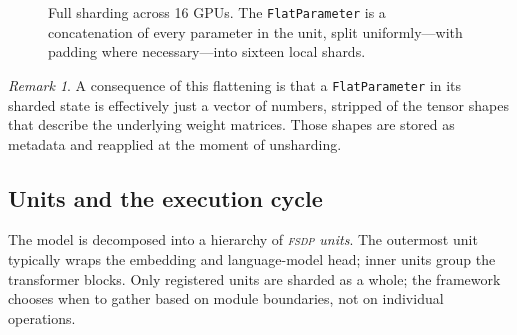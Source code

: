 \documentclass[11pt,a4paper]{article}
\theoremstyle{definition}
\theoremstyle{remark}
\newtheorem*{remark}{Remark}
\newcommand{\FSDP}{\textsc{fsdp}}
\begin{document}
\begin{figure}[ht]
\centering
{}
\caption{Full sharding across 16 GPUs. The \texttt{FlatParameter} is a concatenation of every parameter in the unit, split uniformly---with padding where necessary---into sixteen local shards.}
\label{fig:flatparam}
\end{figure}

\begin{remark}
A consequence of this flattening is that a \texttt{FlatParameter} in its sharded state is effectively just a vector of numbers, stripped of the tensor shapes that describe the underlying weight matrices. Those shapes are stored as metadata and reapplied at the moment of unsharding.
\end{remark}

\subsection{Units and the execution cycle}

The model is decomposed into a hierarchy of \emph{\FSDP{} units}. The outermost unit typically wraps the embedding and language-model head; inner units group the transformer blocks. Only registered units are sharded as a whole; the framework chooses when to gather based on module boundaries, not on individual operations.
\end{document}
